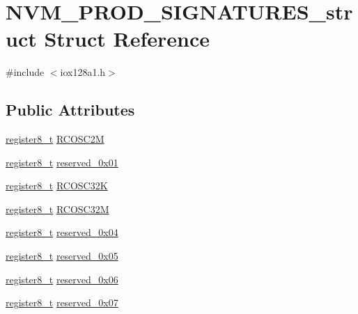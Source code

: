 \hypertarget{struct_n_v_m___p_r_o_d___s_i_g_n_a_t_u_r_e_s__struct}{
\section{NVM\_\-PROD\_\-SIGNATURES\_\-struct Struct Reference}
\label{struct_n_v_m___p_r_o_d___s_i_g_n_a_t_u_r_e_s__struct}
}


{\ttfamily \#include $<$iox128a1.h$>$}

\subsection*{Public Attributes}
\begin{DoxyCompactItemize}
\item 
\hyperlink{iox128a1_8h_a6a0649252b392263406882923b04a9db}{register8\_\-t} \hyperlink{struct_n_v_m___p_r_o_d___s_i_g_n_a_t_u_r_e_s__struct_ada9463cb389ef6972078fb0159808616}{RCOSC2M}
\item 
\hyperlink{iox128a1_8h_a6a0649252b392263406882923b04a9db}{register8\_\-t} \hyperlink{struct_n_v_m___p_r_o_d___s_i_g_n_a_t_u_r_e_s__struct_a042bf0b3c83cccc0a65d6e3c5b233207}{reserved\_\-0x01}
\item 
\hyperlink{iox128a1_8h_a6a0649252b392263406882923b04a9db}{register8\_\-t} \hyperlink{struct_n_v_m___p_r_o_d___s_i_g_n_a_t_u_r_e_s__struct_a9e6e4f803a5cb9630dcf36905d4f6f93}{RCOSC32K}
\item 
\hyperlink{iox128a1_8h_a6a0649252b392263406882923b04a9db}{register8\_\-t} \hyperlink{struct_n_v_m___p_r_o_d___s_i_g_n_a_t_u_r_e_s__struct_a1087209382fc625bbc0620d837e7d1aa}{RCOSC32M}
\item 
\hyperlink{iox128a1_8h_a6a0649252b392263406882923b04a9db}{register8\_\-t} \hyperlink{struct_n_v_m___p_r_o_d___s_i_g_n_a_t_u_r_e_s__struct_ad82ca4471f2d41fe3a47c132413f74a7}{reserved\_\-0x04}
\item 
\hyperlink{iox128a1_8h_a6a0649252b392263406882923b04a9db}{register8\_\-t} \hyperlink{struct_n_v_m___p_r_o_d___s_i_g_n_a_t_u_r_e_s__struct_a41f54893951aec63b2566a55b6507ef2}{reserved\_\-0x05}
\item 
\hyperlink{iox128a1_8h_a6a0649252b392263406882923b04a9db}{register8\_\-t} \hyperlink{struct_n_v_m___p_r_o_d___s_i_g_n_a_t_u_r_e_s__struct_ac63e4aed2a6dd1a0335b9859242927b0}{reserved\_\-0x06}
\item 
\hyperlink{iox128a1_8h_a6a0649252b392263406882923b04a9db}{register8\_\-t} \hyperlink{struct_n_v_m___p_r_o_d___s_i_g_n_a_t_u_r_e_s__struct_af7327a672bd0442079bad66b37864b2a}{reserved\_\-0x07}

\end{DoxyCompactItemize}
